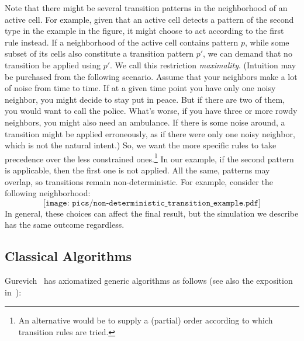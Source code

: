 \documentclass[submission,copyright,creativecommons,english]{eptcs}
\begin{document}
Note that there might be several transition patterns in the neighborhood of an active cell.
For example, given that an active cell detects a pattern of the second type in the  example in the figure, it might choose to act according to the first rule instead.
If a  neighborhood of the active cell contains pattern $p$, while some subset of its cells also constitute a transition pattern $p'$,
we can demand that no transition be applied using $p'$. We call this restriction \emph{maximality}.
(Intuition may be purchased from the following scenario.
Assume that your neighbors make a lot of noise from time to time. If at a given time point you have only one noisy neighbor, you might decide to stay put in peace.
But if there are two of them, you would want to call the police. What's worse, if you have three or more rowdy neighbors, you might also need an ambulance.
If there is some noise around, a transition might be applied erroneously, as if there were only one noisy neighbor, which is not the natural intent.)
So, we want the more specific rules to take precedence over the less constrained ones.\footnote{{An alternative would be to supply a (partial) order according to which transition rules are tried.}}
In our example, if the second pattern is applicable, then the first one is not  applied.
All the same, patterns may overlap, so transitions remain non-deterministic. For example, consider the following neighborhood:
\[\texttt{[image: pics/non-deterministic\_transition\_example.pdf]}\]
In general, these choices can affect the final result, but the simulation we describe has the same outcome regardless.


\subsection{Classical Algorithms} \label{sec:alg}

Gurevich~\cite{ASM-Theorem-Gurevich} has axiomatized generic algorithms as follows (see also the exposition in~\cite{Generic}):
\end{document}
